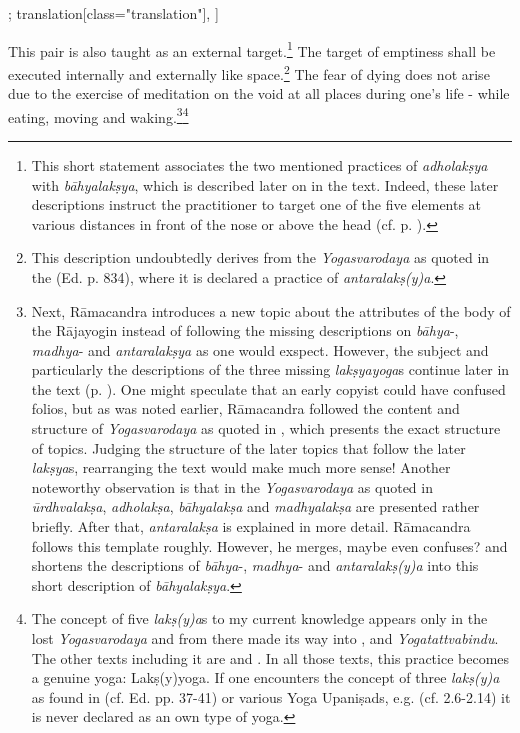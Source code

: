 \begin{alignment}[
  texts=edition[class="edition"];
  translation[class="translation"],
  ]
\begin{translation}
\begin{tlate}
    This pair is also taught as an external target.\footnote{This short statement associates the two mentioned practices of \textit{adholakṣya} with \textit{bāhyalakṣya}, which is described later on in the text. Indeed, these later descriptions instruct the practitioner to target one of the five elements at various distances in front of the nose or above the head (cf. p. \pageref{bahya2}).} The target of emptiness shall be executed internally and externally like space.\footnote{This description undoubtedly derives from the \textit{Yogasvarodaya} as quoted in the  (Ed. p. 834), where it is declared a practice of \textit{antaralakṣ(y)a}.} The fear of dying does not arise due to the exercise of meditation on the void at all places during one's life - while eating, moving and waking.\footnote{Next, Rāmacandra introduces a new topic about the attributes of the body of the Rājayogin instead of following the missing descriptions on \textit{bāhya}-, \textit{madhya}- and \textit{antaralakṣya} as one would exspect. However, the subject and particularly the descriptions of the three missing \textit{lakṣyayoga}s continue later in the text (p. \pageref{bahya2}). One might speculate that an early copyist could have confused folios, but as was noted earlier, Rāmacandra followed the content and structure of \textit{Yogasvarodaya} as quoted in , which presents the exact structure of topics. Judging the structure of the later topics that follow the later \textit{lakṣya}s, rearranging the text would make much more sense! Another noteworthy observation is that in the \textit{Yogasvarodaya} as quoted in  \textit{ūrdhvalakṣa}, \textit{adholakṣa}, \textit{bāhyalakṣa} and \textit{madhyalakṣa} are presented rather briefly. After that, \textit{antaralakṣa} is explained in more detail. Rāmacandra follows this template roughly. However, he merges, maybe even confuses? and shortens the descriptions of \textit{bāhya}-, \textit{madhya}- and \textit{antaralakṣ(y)a} into this short description of \textit{bāhyalakṣya}.}\footnote{The concept of five \textit{lakṣ(y)a}s to my current knowledge appears only in the lost \textit{Yogasvarodaya} and from there made its way into ,  and \textit{Yogatattvabindu}. The other texts including it are  and . In all those texts, this practice becomes a genuine yoga: Lakṣ(y)yoga. If one encounters the concept of three \textit{lakṣ(y)a} as found in  (cf. Ed. pp. 37-41) or various Yoga Upaniṣads, e.g.  (cf. 2.6-2.14) it is never declared as an own type of yoga.} \vspace*{\fill}
    \end{tlate}
  \end{translation}
  \ekdpb*{}
\end{alignment}
